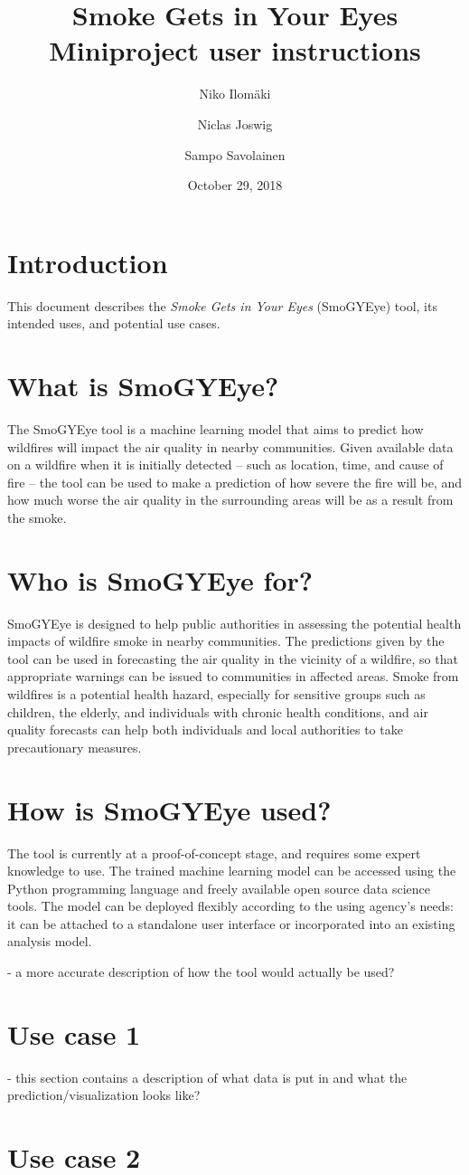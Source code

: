 \documentclass[a4paper,12pt]{article}
\title{Smoke Gets in Your Eyes\\\Large{Miniproject user instructions}}
\author{Niko Ilomäki \and Niclas Joswig \and Sampo Savolainen}
\date{October 29, 2018}
\begin{document}
\maketitle

\section{Introduction}

This document describes the \textit{Smoke Gets in Your Eyes} (SmoGYEye) tool, its intended uses, and potential use cases.

\section{What is SmoGYEye?}

The SmoGYEye tool is a machine learning model that aims to predict how wildfires will impact the air quality in nearby communities. Given available data on a wildfire when it is initially detected – such as location, time, and cause of fire – the tool can be used to make a prediction of how severe the fire will be, and how much worse the air quality in the surrounding areas will be as a result from the smoke.

\section{Who is SmoGYEye for?}

SmoGYEye is designed to help public authorities in assessing the potential health impacts of wildfire smoke in nearby communities. The predictions given by the tool can be used in forecasting the air quality in the vicinity of a wildfire, so that appropriate warnings can be issued to communities in affected areas. Smoke from wildfires is a potential health hazard, especially for sensitive groups such as children, the elderly, and individuals with chronic health conditions, and air quality forecasts can help both individuals and local authorities to take precautionary measures.

\section{How is SmoGYEye used?}

The tool is currently at a proof-of-concept stage, and requires some expert knowledge to use. The trained machine learning model can be accessed using the Python programming language and freely available open source data science tools. The model can be deployed flexibly according to the using agency's needs: it can be attached to a standalone user interface or incorporated into an existing analysis model.

- a more accurate description of how the tool would actually be used?

\section{Use case 1}

- this section contains a description of what data is put in and what the prediction/visualization looks like?

\section{Use case 2}
\end{document}
